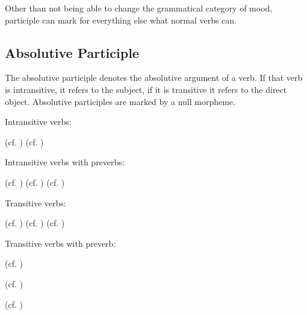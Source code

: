 \documentclass[a4paper, 10pt]{book}
\begin{document}
Other than not being able to change the grammatical category of mood, participle can mark for everything else what normal verbs can. 

\subsection{Absolutive Participle}
The absolutive participle denotes the absolutive argument of a verb. If that verb is intransitive, it refers to the subject, if it is transitive it refers to the direct object. Absolutive participles are marked by a null morpheme. 

Intransitive verbs:
\begin{exe}
\ex
\begin{xlist}
    \ex {} (cf. )
    \ex {} (cf. )
\end{xlist}
\end{exe}

Intransitive verbs with preverbs: 
\begin{exe}
\ex
\begin{xlist}
    \ex {} (cf. )  
    \ex {} (cf. )    
    \ex {} (cf. )
\end{xlist}
\end{exe}

Transitive verbs:
\begin{exe}
\ex
\begin{xlist}
    \ex {} (cf. )
    \ex {} (cf. )
    \ex {} (cf. )
\end{xlist}
\end{exe}

Transitive verbs with preverb:
\begin{exe}
\ex
\begin{xlist}
    \item {} (cf. )
    \item {} (cf. )
    \item {} (cf. )
\end{xlist}
\end{exe}
\end{document}
